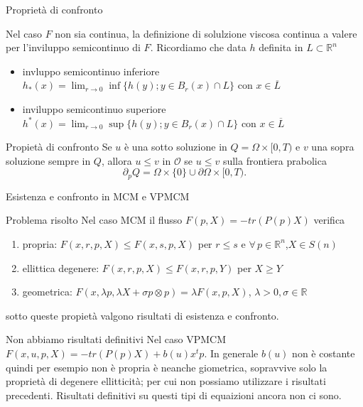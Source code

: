 \begin{frame}{Proprietà di confronto}
  \begin{osservazione}
    Nel caso $F$ non sia continua, la definizione di solulzione
    viscosa continua a valere per l'inviluppo semicontinuo di
    $F$. Ricordiamo che data $h$ definita in $L\subset\mathbb{R}^n$
    \begin{itemize}
    \item  invluppo semicontinuo inferiore $h_*(x)=\lim_{r\to
      0}\inf\{h(y); y\in B_r(x)\cap L\}$ con $x\in\overline{L}$
    \item inviluppo semicontinuo superiore $h^*(x)=\lim_{r\to
      0}\sup\{h(y);y\in B_r(x)\cap L\}$ con $x\in\overline{L}$
    \end{itemize}
  \end{osservazione}
  \begin{block}{Propietà di confronto}
    Se $u$ è una sotto soluzione in $Q=\Omega\times[0,T)$ e
      $v$ una sopra  soluzione sempre in $Q$,  allora $u\leq
      v$ in $\mathcal{O}$ se $u\leq v$ sulla frontiera prabolica 
    \[
    \partial_pQ=\Omega\times\{0\}\cup\partial\Omega\times[0,T).
    \]
  \end{block}
\end{frame}

\begin{frame}{Esistenza e confronto in MCM e VPMCM}
  \begin{block}{Problema risolto}
    Nel caso MCM il flusso $F(p,X)=-tr(P(p)X)$ verifica
    \begin{enumerate}
    \item \alert{propria}: $F(x,r,p,X)\leq F(x,s,p,X)$ per $r\leq
      s$ e $\forall\,p\in\mathbb{R}^n$,$X\in S(n)$
    \item \alert{ellittica degenere}: $F(x,r,p,X)\leq
      F(x,r,p,Y)$ per $X\geq Y$
    \item \alert{geometrica}: $F(x,\lambda p,\lambda X+\sigma
      p\otimes p)=\lambda F(x,p,X)$, $\lambda >0,\sigma\in\mathbb{R}$
    \end{enumerate}
    sotto queste propietà valgono risultati di esistenza e confronto.
  \end{block}
  \begin{block}{Non abbiamo risultati definitivi}
    Nel caso VPMCM $F(x,u,p,X)=-tr(P(p)X)+b(u)x^tp$. In generale
    $b(u)$ non è costante quindi per esempio non è
    \alert{propria} è neanche \alert{giometrica}, sopravvive solo la
    proprietà di \alert{degenere ellitticità}; per cui  non possiamo
    utilizzare i risultati precedenti. Risultati definitivi su
    questi tipi di equaizioni ancora non ci sono.
  \end{block}
\end{frame}
